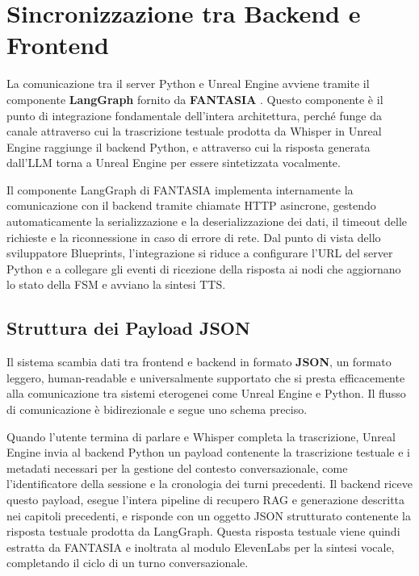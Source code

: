 \newpage

\section{Sincronizzazione tra Backend e Frontend}

La comunicazione tra il server Python e Unreal Engine avviene tramite il componente \textbf{LangGraph} fornito da \textbf{FANTASIA} \cite{fantasia1, fantasia2}. Questo componente è il punto di integrazione fondamentale dell'intera architettura, perché funge da canale attraverso cui la trascrizione testuale prodotta da Whisper in Unreal Engine raggiunge il backend Python, e attraverso cui la risposta generata dall'LLM torna a Unreal Engine per essere sintetizzata vocalmente.

Il componente LangGraph di FANTASIA implementa internamente la comunicazione con il backend tramite chiamate HTTP asincrone, gestendo automaticamente la serializzazione e la deserializzazione dei dati, il timeout delle richieste e la riconnessione in caso di errore di rete. Dal punto di vista dello sviluppatore Blueprints, l'integrazione si riduce a configurare l'URL del server Python e a collegare gli eventi di ricezione della risposta ai nodi che aggiornano lo stato della FSM e avviano la sintesi TTS.

\subsection{Struttura dei Payload JSON}

Il sistema scambia dati tra frontend e backend in formato \textbf{JSON}, un formato leggero, human-readable e universalmente supportato che si presta efficacemente alla comunicazione tra sistemi eterogenei come Unreal Engine e Python. Il flusso di comunicazione è bidirezionale e segue uno schema preciso.

Quando l'utente termina di parlare e Whisper completa la trascrizione, Unreal Engine invia al backend Python un payload contenente la trascrizione testuale e i metadati necessari per la gestione del contesto conversazionale, come l'identificatore della sessione e la cronologia dei turni precedenti. Il backend riceve questo payload, esegue l'intera pipeline di recupero RAG e generazione descritta nei capitoli precedenti, e risponde con un oggetto JSON strutturato contenente la risposta testuale prodotta da LangGraph. Questa risposta testuale viene quindi estratta da FANTASIA e inoltrata al modulo ElevenLabs per la sintesi vocale, completando il ciclo di un turno conversazionale.

